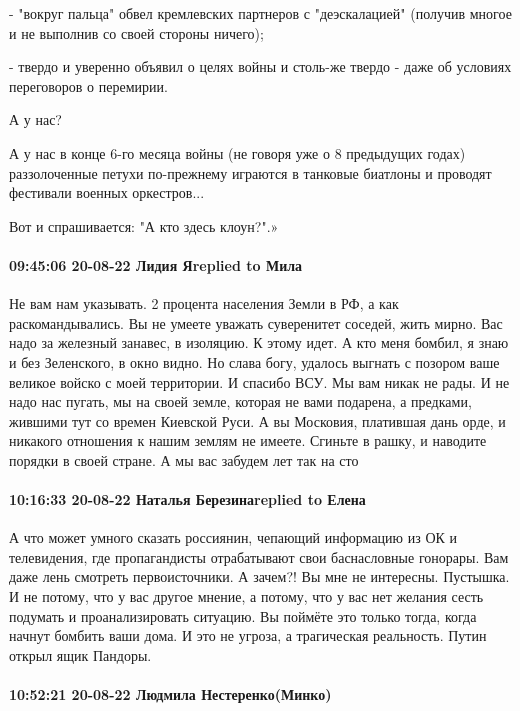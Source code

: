 - "вокруг пальца" обвел кремлевских партнеров с "деэскалацией" (получив многое и не выполнив со своей стороны ничего);

- твердо и уверенно объявил о целях войны и столь-же твердо - даже об условиях переговоров о перемирии.

А у нас?

А у нас в конце 6-го месяца войны (не говоря уже о 8 предыдущих годах) раззолоченные петухи по-прежнему играются в танковые биатлоны и проводят фестивали военных оркестров...

Вот и спрашивается: "А кто здесь клоун?".»

\paragraph{09:45:06 20-08-22 Лидия Яreplied to Мила}

Не вам нам указывать. 2 процента населения Земли в РФ, а как раскомандывались.
Вы не умеете уважать суверенитет соседей, жить мирно. Вас надо за железный
занавес, в изоляцию. К этому идет. А кто меня бомбил, я знаю и без Зеленского,
в окно видно. Но слава богу, удалось выгнать с позором ваше великое войско с
моей территории. И спасибо ВСУ. Мы вам никак не рады. И не надо нас пугать, мы
на своей земле, которая не вами подарена, а предками, жившими тут со времен
Киевской Руси. А вы Московия, платившая дань орде, и никакого отношения к нашим
землям не имеете. Сгиньте в рашку, и наводите порядки в своей стране. А мы вас
забудем лет так на сто

\paragraph{10:16:33 20-08-22 Наталья Березинаreplied to Елена}

А что может умного сказать россиянин, чепающий информацию из ОК и телевидения,
где пропагандисты отрабатывают свои баснасловные гонорары. Вам даже лень
смотреть первоисточники. А зачем?! Вы мне не интересны. Пустышка. И не потому,
что у вас другое мнение, а потому, что у вас нет желания сесть подумать и
проанализировать ситуацию. Вы поймёте это только тогда, когда начнут бомбить
ваши дома. И это не угроза, а трагическая реальность. Путин открыл ящик
Пандоры.

\paragraph{10:52:21 20-08-22 Людмила Нестеренко(Минко)}

